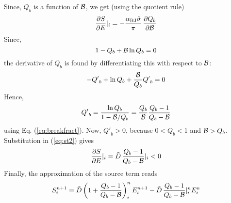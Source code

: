 \documentclass[12pt]{book}
\begin{document}
Since, $Q_b$ is a function of ${\cal B}$, we get (using the quotient rule)
\begin{equation}
  \frac{\partial S}{\partial E} |_i = -\frac{\alpha_{\rm BJ} \tilde{\sigma}}{\pi}\, \frac{\partial Q_b}{\partial {\cal B}}
  \label{eq:st2}
\end{equation}
Since,
\begin{equation}
  1- Q_b + {\cal B} \ln Q_b = 0
  \label{eq:breakfract}
\end{equation}
the derivative of $Q_b$ is found by differentiating this with respect to ${\cal B}$:
\begin{equation}
  -{Q'}_{b} + \ln Q_b + \frac{\cal B}{Q_b} {Q'}_{b} = 0
\end{equation}
Hence,
\begin{equation}
  {Q'}_{b} = \frac{\ln Q_b}{1 - {\cal B}/Q_b} = \frac{Q_b}{\cal B} \frac{Q_b - 1}{Q_b - {\cal B}}
\end{equation}
using Eq. (\ref{eq:breakfract}). Now, ${Q'}_{b} > 0$, because $0 < Q_b < 1$ and ${\cal B} > Q_b$.
Substitution in (\ref{eq:st2}) gives
\begin{equation}
  \frac{\partial S}{\partial E} |_i = {\tilde D} \, \frac{Q_b - 1}{Q_b - {\cal B}} |_i < 0
\end{equation}
Finally, the approximation of the source term reads
\begin{equation}
  S^{n+1}_{i} = {\tilde D} \left( 1 + \frac{Q_b - 1}{Q_b - {\cal B}} \right)_i^n E_i^{n+1} - {\tilde D} \, \frac{Q_b - 1}{Q_b - {\cal B}} |^n_i E_i^n
\end{equation}

 \label{ch:bc}
\end{document}
